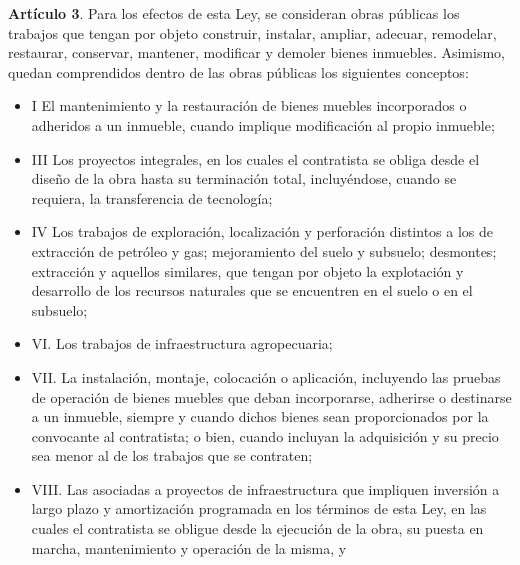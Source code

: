 \textbf{Artículo 3}. Para los efectos de esta Ley, se consideran obras públicas los trabajos que tengan por objeto construir, instalar, ampliar, adecuar, remodelar, restaurar, conservar, mantener, modificar y demoler bienes inmuebles. Asimismo, quedan comprendidos dentro de las obras públicas los siguientes conceptos:
\begin{itemize}
    \item I El mantenimiento y la restauración de bienes muebles incorporados o adheridos a un inmueble, cuando implique modificación al propio inmueble;
    \item III Los proyectos integrales, en los cuales el contratista se obliga desde el diseño de la obra hasta su terminación total, incluyéndose, cuando se requiera, la transferencia de tecnología;
    \item IV Los trabajos de exploración, localización y perforación distintos a los de extracción de petróleo y gas; mejoramiento del suelo y subsuelo; desmontes; extracción y aquellos similares, que tengan por objeto la explotación y desarrollo de los recursos naturales que se encuentren en el suelo o en el subsuelo;
    \item VI. Los trabajos de infraestructura agropecuaria;
    \item VII. La instalación, montaje, colocación o aplicación, incluyendo las pruebas de operación de bienes muebles que deban incorporarse, adherirse o destinarse a un inmueble, siempre y cuando dichos bienes sean proporcionados por la convocante al contratista; o bien, cuando incluyan la adquisición y su precio sea menor al de los trabajos que se contraten;
    \item VIII. Las asociadas a proyectos de infraestructura que impliquen inversión a largo plazo y amortización programada en los términos de esta Ley, en las cuales el contratista se obligue desde la ejecución de la obra, su puesta en marcha, mantenimiento y operación de la misma, y
\end{itemize}

